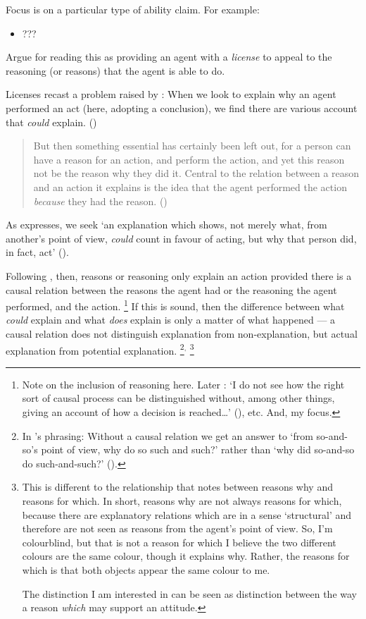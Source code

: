 \documentclass[10pt]{article}
\begin{document}
Focus is on a particular type of ability claim.
For example:
\begin{itemize}
\item ???
\end{itemize}

Argue for reading this as providing an agent with a \emph{license} to appeal to the reasoning (or reasons) that the agent is able to do.

Licenses recast a problem raised by \citeauthor{Davidson:2001aa}:
When we look to explain why an agent performed an act (here, adopting a conclusion), we find there are various account that \emph{could} explain.
(\citeauthor[7--8]{Davidson:2001aa})
\begin{quote}
  But then something essential has certainly been left out, for a person can have a reason for an action, and perform the action, and yet this reason not be the reason why they did it.
  Central to the relation between a reason and an action it explains is the idea that the agent performed the action \emph{because} they had the reason.\nolinebreak
  \mbox{}\hfill\mbox{(\citeyear[9]{Davidson:2001aa})}
\end{quote}
As \citeauthor{Hieronymi:2011aa} expresses, we seek `an explanation which shows, not merely what, from another’s point of view, \emph{could} count in favour of acting, but why that person did, in fact, act' (\citeyear[417]{Hieronymi:2011aa}).

Following \citeauthor{Davidson:2001aa}, then, reasons or reasoning only explain an action provided there is a causal relation between the reasons the agent had or the reasoning the agent performed, and the action.\nolinebreak
\footnote{
  Note on the inclusion of reasoning here.
  Later \citeauthor{Davidson:2001aa}: `I do not see how the right sort of causal process can be distinguished without, among other things, giving an account of how a decision is reached\dots' (\citeyear[232]{Davidson:2001aa}), etc.
  And, my focus.
}
If this is sound, then the difference between what \emph{could} explain and what \emph{does} explain is only a matter of what happened --- a causal relation does not distinguish explanation from non-explanation, but actual explanation from potential explanation.\nolinebreak
\footnote{
  In \citeauthor{Hieronymi:2011aa}'s phrasing: Without a causal relation we get an answer to ‘from so-and-so’s point of view, why do so such and such?’ rather than ‘why did so-and-so do such-and-such?’ (\citeyear[417]{Hieronymi:2011aa}).
}\(^{,}\)\nolinebreak
\footnote{
  {
    \color{red}
    This is different to the relationship that \citeauthor{Neta:2019aa} notes between reasons why and reasons for which.
    In short, reasons why are not always reasons for which, because there are explanatory relations which are in a sense `structural' and therefore are not seen as reasons from the agent's point of view.
    So, I'm colourblind, but that is not a reason for which I believe the two different colours are the same colour, though it explains why.
    Rather, the reasons for which is that both objects appear the same colour to me.

    The distinction I am interested in can be seen as distinction between the way a reason \emph{which} may support an attitude.
  }
}
\end{document}
